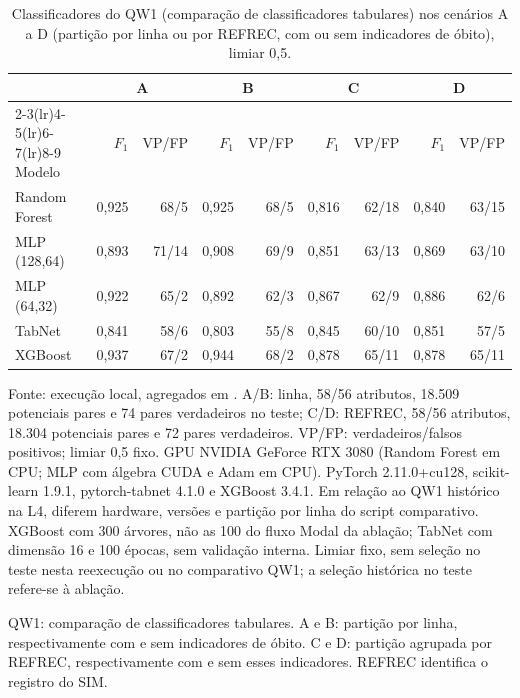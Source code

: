 \begin{table}[htbp]
\centering\footnotesize
\caption{Classificadores do QW1 (comparação de classificadores tabulares) nos cenários A a D (partição por linha ou por REFREC, com ou sem indicadores de óbito), limiar 0,5.}
\label{tab:sensibilidade-qw1}
\setlength{\tabcolsep}{4pt}
\begin{tabular}{lrrrrrrrr}
\toprule
 & \multicolumn{2}{c}{A} & \multicolumn{2}{c}{B} & \multicolumn{2}{c}{C} & \multicolumn{2}{c}{D} \\
\cmidrule(lr){2-3}\cmidrule(lr){4-5}\cmidrule(lr){6-7}\cmidrule(lr){8-9}
Modelo & $F_1$ & VP/FP & $F_1$ & VP/FP & $F_1$ & VP/FP & $F_1$ & VP/FP \\
\midrule
Random Forest & 0,925 & 68/5 & 0,925 & 68/5 & 0,816 & 62/18 & 0,840 & 63/15 \\
MLP (128,64) & 0,893 & 71/14 & 0,908 & 69/9 & 0,851 & 63/13 & 0,869 & 63/10 \\
MLP (64,32) & 0,922 & 65/2 & 0,892 & 62/3 & 0,867 & 62/9 & 0,886 & 62/6 \\
TabNet & 0,841 & 58/6 & 0,803 & 55/8 & 0,845 & 60/10 & 0,851 & 57/5 \\
XGBoost & 0,937 & 67/2 & 0,944 & 68/2 & 0,878 & 65/11 & 0,878 & 65/11 \\
\bottomrule
\end{tabular}
\begin{minipage}{0.98\textwidth}\footnotesize Fonte: execução local, agregados em . A/B: linha, 58/56 atributos, 18.509 potenciais pares e 74 pares verdadeiros no teste; C/D: REFREC, 58/56 atributos, 18.304 potenciais pares e 72 pares verdadeiros. VP/FP: verdadeiros/falsos positivos; limiar 0,5 fixo. GPU NVIDIA GeForce RTX 3080 (Random Forest em CPU; MLP com álgebra CUDA e Adam em CPU). PyTorch 2.11.0+cu128, scikit-learn 1.9.1, pytorch-tabnet 4.1.0 e XGBoost 3.4.1. Em relação ao QW1 histórico na L4, diferem hardware, versões e partição por linha do script comparativo. XGBoost com 300 árvores, não as 100 do fluxo Modal da ablação; TabNet com dimensão 16 e 100 épocas, sem validação interna. Limiar fixo, sem seleção no teste nesta reexecução ou no comparativo QW1; a seleção histórica no teste refere-se à ablação.
\end{minipage}
\par\footnotesize QW1: comparação de classificadores tabulares. A e B: partição por linha, respectivamente com e sem indicadores de óbito. C e D: partição agrupada por REFREC, respectivamente com e sem esses indicadores. REFREC identifica o registro do SIM.
\end{table}
